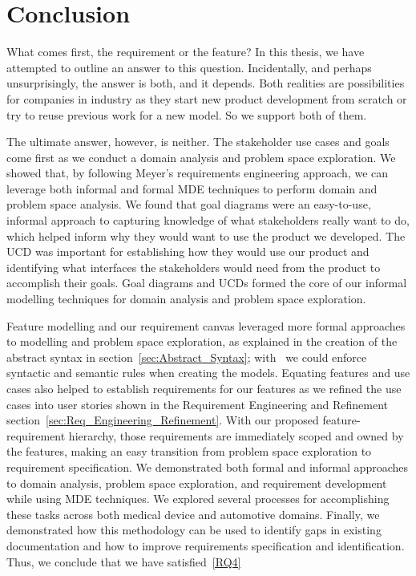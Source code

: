 \chapter{Conclusion}
\label{chap:Conclusion}

What comes first, the requirement or the feature? In this thesis, we have attempted to outline an answer to this question. Incidentally, and perhaps unsurprisingly, the answer is both, and it depends. Both realities are possibilities for companies in industry as they start new product development from scratch or try to reuse previous work for a new model. So we support both of them. 

The ultimate answer, however, is neither. The stakeholder use cases and goals come first as we conduct a domain analysis and problem space exploration. We showed that, by following Meyer's requirements engineering approach, we can leverage both informal and formal \gls{MDE} techniques to perform domain and problem space analysis. We found that goal diagrams were an easy-to-use, informal approach to capturing knowledge of what stakeholders really want to do, which helped inform why they would want to use the product we developed. The \gls{UCD} was important for establishing how they would use our product and identifying what interfaces the stakeholders would need from the product to accomplish their goals. Goal diagrams and \gls{UCD}s formed the core of our informal modelling techniques for domain analysis and problem space exploration.

Feature modelling and our requirement canvas leveraged more formal approaches to modelling and problem space exploration, as explained in the creation of the abstract syntax in section~\ref{sec:Abstract_Syntax}; with \tool\ we could enforce syntactic and semantic rules when creating the models. Equating features and use cases also helped to establish requirements for our features as we refined the use cases into user stories shown in the Requirement Engineering and Refinement section~\ref{sec:Req_Engineering_Refinement}. With our proposed feature-requirement hierarchy, those requirements are immediately scoped and owned by the features, making an easy transition from problem space exploration to requirement specification. We demonstrated both formal and informal approaches to domain analysis, problem space exploration, and requirement development while using \gls{MDE} techniques. We explored several processes for accomplishing these tasks across both medical device and automotive domains. Finally, we demonstrated how this methodology can be used to identify gaps in existing documentation and how to improve requirements specification and identification. Thus, we conclude that we have satisfied~\ref{RQ4}

